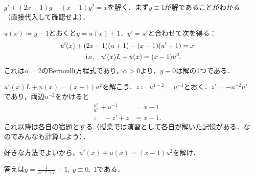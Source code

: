 \begin{example}
    $y'+(2x-1)y-(x-1)y^2=x$を解く．まず$y \equiv 1$が解であることがわかる（直接代入して確認せよ）．
    
    $u(x) \coloneqq y-1$とおくと$y=u(x)+1$．$y'=u'$と合わせて次を得る：
    \begin{align*}
        u'(x) + (2x-1)(u+1) - (x-1)(u'+1) &= x \\
        \text{i.e.} \quad u'(x) L+ u(x) = (x-1)u^2.
    \end{align*}
    これは$\alpha=2$のBernoulli方程式であり，$\alpha>0$より，$y \equiv 0$は解の1つである．

    $u'(x) L+ u(x) = (x-1)u^2$を解こう．$z \coloneqq u^{1-2}=u^{-1}$とおく．$z'=-u^{-2}u'$であり，両辺$u^{-2}$をかけると
    \begin{align*}
        \frac{u'}{u^2} + u^{-1} &= x-1 \\
        \therefore \quad -z' + z &= x-1.
    \end{align*}
    これ以降は各自の宿題とする（授業では演習として各自が解いた記憶がある．なのでみんなも計算しよう）．
\end{example}

\begin{homework*}
    好きな方法でよいから，$u'(x) + u(x) = (x-1)u^2$を解け．

    答えは$y=\frac{1}{xe^{-x}+c}+1, \; y \equiv 0, \; 1$である．
\end{homework*}